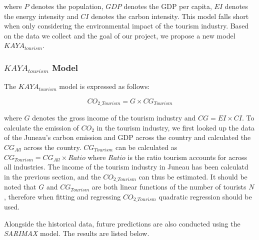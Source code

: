 where $P$ denotes the population, $GDP$ denotes the GDP per capita, 
$EI$ denotes the energy intensity and $CI$ denotes the carbon intensity.
This model falls short when only considering the environmental impact of the tourism industry.
Based on the data we collect and the goal of our project, we propose a new model $KAYA_{tourism}$.


\subsubsection{$KAYA_{tourism}$ Model}

The $KAYA_{tourism}$ model is expressed as follows:

\begin{equation}
    CO_{2\_Tourism}=G \times CG_{Tourism}
\end{equation}

where $G$ denotes the gross income of the tourism industry and $CG = EI \times CI$. To calculate 
the emission of $CO_2$ in the tourism industry, we first looked up the data of the Juneau's carbon emission and
GDP across the country and calculated the $CG_{All}$ across the country. $CG_{Tourism}$ can 
be calculated as $CG_{Tourism} = CG_{All} \times Ratio $  where $Ratio$ is the 
ratio tourism accounts for across all industries. The income of the tourism industry in Juneau 
has been calculatd in the previous section, and the $CO_{2\_Tourism}$ can thus be estimated.
It should be noted that $G$ and $CG_{Tourism}$ are both linear functions of the number of tourists $N$,
therefore when fitting and regressing $CO_{2\_Tourism}$ quadratic regression should be used.

Alongside the historical data, future predictions are also conducted using the \textit{SARIMAX} model.
The results are listed below.


